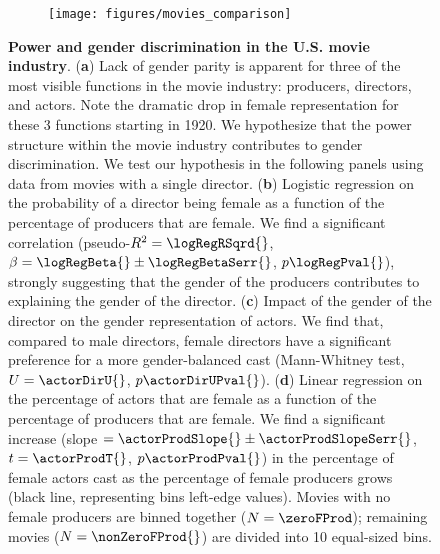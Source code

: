 \begin{figure}[t]
    \begin{subfigure}{0.7\textwidth}
        \texttt{[image: figures/movies\_comparison]}
        \label{fig:movies:comparison_a}
    \end{subfigure}
    \begin{subfigure}{0\textwidth}
        \label{fig:movies:comparison_b}
    \end{subfigure}
    \begin{subfigure}{0\textwidth}
        \label{fig:movies:comparison_c}
    \end{subfigure}
    \begin{subfigure}{0\textwidth}
        \label{fig:movies:comparison_d}
    \end{subfigure}
\caption[Power and gender discrimination in the U.S. movie industry.]{\textbf{Power and gender discrimination in the U.S. movie industry}. (\textbf{a}) Lack of gender parity is apparent for three of the most visible functions in the movie industry: producers, directors, and actors. Note the dramatic drop in female representation for these 3 functions starting in 1920. We hypothesize that the power structure within the movie industry contributes to gender discrimination. We test our hypothesis in the following panels using data from movies with a single director. (\textbf{b}) Logistic regression on the probability of a director being female as a function of the percentage of producers that are female. We find a significant correlation (pseudo-$R^2 = \logRegRSqrd{}$, $\beta = \logRegBeta{} \pm \logRegBetaSerr{}$, $p \logRegPval{}$), strongly suggesting that the gender of the producers contributes to explaining the gender of the director. (\textbf{c}) Impact of the gender of the director on the gender representation of actors. We find that, compared to male directors, female directors have a significant preference for a more gender-balanced cast (Mann-Whitney test, $U = \actorDirU{}$, $p \actorDirUPval{}$). (\textbf{d}) Linear regression on the percentage of actors that are female as a function of the percentage of producers that are female. We find a significant increase (slope $ = \actorProdSlope{} \pm \actorProdSlopeSerr{}$, $t = \actorProdT{}$, $p \actorProdPval{}$) in the percentage of female actors cast as the percentage of female producers grows (black line, representing bins left-edge values). Movies with no female producers are binned together ($N = \zeroFProd$); remaining movies ($N = \nonZeroFProd{}$) are divided into 10 equal-sized bins.}
\label{fig:movies:comparison}
\end{figure}


